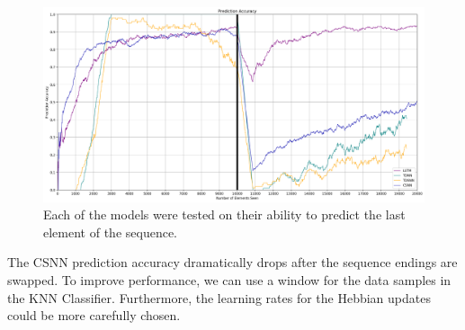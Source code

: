 \documentclass{article}
\begin{document}
\begin{figure}[!h]
    \centering
    \includegraphics[width=0.9\linewidth]{prediction-accuracy.png}
    \caption{Each of the models were tested on their ability to predict the last element of the sequence.}
    \label{fig:prediction-accuracy}
\end{figure}

The CSNN prediction accuracy dramatically drops after the sequence endings are swapped. To improve performance, we can use a window for the data samples in the KNN Classifier. Furthermore, the learning rates for the Hebbian updates could be more carefully chosen.





\newpage
\printbibliography[title={References}]
\end{document}
